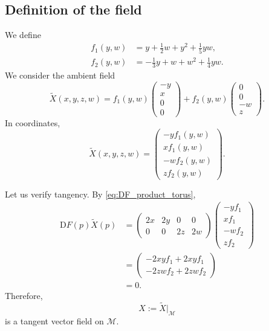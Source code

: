 \documentclass[11pt]{article}
\newcommand{\M}{\mathcal{M}}
\newcommand{\D}{\mathrm{D}}
\begin{document}
\subsection*{Definition of the field}

We define
\begin{align}
    f_1(y,w)
    &=
    y+\frac12w+y^2+\frac15yw,
    \label{eq:f1_product_torus}\\
    f_2(y,w)
    &=
    -\frac13y+w+w^2+\frac14yw.
    \label{eq:f2_product_torus}
\end{align}
We consider the ambient field
\begin{equation}\label{eq:field_product_torus}
    \widetilde X(x,y,z,w)
    =
    f_1(y,w)
    \begin{pmatrix}
        -y\\x\\0\\0
    \end{pmatrix}
    +
    f_2(y,w)
    \begin{pmatrix}
        0\\0\\-w\\z
    \end{pmatrix}.
\end{equation}
In coordinates,
\begin{equation}\label{eq:field_product_torus_components}
    \widetilde X(x,y,z,w)
    =
    \begin{pmatrix}
        -yf_1(y,w)\\
        xf_1(y,w)\\
        -wf_2(y,w)\\
        zf_2(y,w)
    \end{pmatrix}.
\end{equation}

Let us verify tangency. By \eqref{eq:DF_product_torus},
\[
\begin{aligned}
    \D F(p)\widetilde X(p)
    &=
    \begin{pmatrix}
        2x&2y&0&0\\
        0&0&2z&2w
    \end{pmatrix}
    \begin{pmatrix}
        -yf_1\\xf_1\\-wf_2\\zf_2
    \end{pmatrix}\\
    &=
    \begin{pmatrix}
        -2xyf_1+2xyf_1\\
        -2zwf_2+2zwf_2
    \end{pmatrix}\\
    &=0.
\end{aligned}
\]
Therefore,
\[
    X:=\widetilde X|_\M
\]
is a tangent vector field on $\M$.
\end{document}
